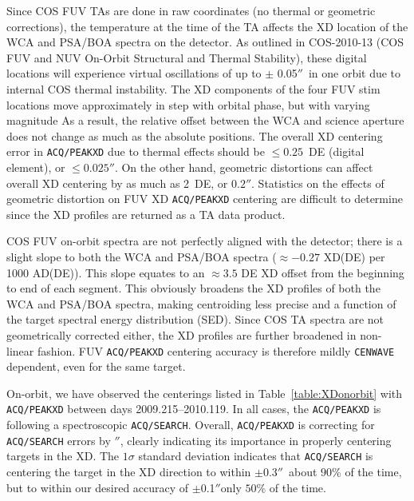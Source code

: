 \documentclass[12pt]{article}
\newcommand{\arcsec}{\ensuremath{''}}
\newcommand{\reallastdate}{2010.119}
\begin{document}
Since COS FUV TAs are done in raw coordinates (no thermal or geometric corrections), the
temperature at the time of the TA affects the XD location of the WCA and PSA/BOA spectra on
the detector. As outlined in COS-2010-13 (COS FUV and NUV On-Orbit Structural and Thermal Stability),
these digital locations will experience virtual oscillations of up to $\pm$ 0.05\arcsec\ in one orbit due to internal COS thermal instability.
The XD components of the four FUV stim locations move approximately in step with orbital phase, but with varying
magnitude As a result, the relative offset between the WCA and science aperture does not change as much as the absolute positions.
The overall XD centering error in \texttt{ACQ/PEAKXD} due to thermal effects should be $\le 0.25$~DE (digital element), or $\le 0.025$\arcsec.
On the other hand, geometric distortions can affect overall XD centering by as much as 2~DE, or $0.2$\arcsec. Statistics on the
effects of geometric distortion on FUV XD \texttt{ACQ/PEAKXD} centering are difficult to determine since the XD profiles are returned as a TA data product.

COS FUV on-orbit spectra are not perfectly aligned with the detector; there is a slight slope to both the WCA and PSA/BOA spectra ($\approx -0.27$ XD(DE) per 1000 AD(DE)).
This slope equates to an $\approx 3.5$ DE XD offset from the beginning to end of each segment.
This obviously broadens the XD profiles of both the WCA and PSA/BOA spectra, making centroiding
less precise and a function of the target spectral energy distribution (SED).
Since COS TA spectra are not geometrically corrected either, the XD profiles are further broadened
in non-linear fashion. FUV \texttt{ACQ/PEAKXD} centering accuracy is therefore mildly \texttt{CENWAVE} dependent, even for the same target.

On-orbit, we have observed the centerings listed in Table~\ref{table:XDonorbit} with \texttt{ACQ/PEAKXD} between days 2009.215--\reallastdate.
In all cases, the \texttt{ACQ/PEAKXD} is following a spectroscopic \texttt{ACQ/SEARCH}.
Overall, \texttt{ACQ/PEAKXD} is correcting for \texttt{ACQ/SEARCH} errors by \avgXD\arcsec,
clearly indicating its importance in properly centering targets in the XD.
The $1\sigma$ standard deviation indicates that \texttt{ACQ/SEARCH} is centering the
target in the XD direction to within $\pm$0.3\arcsec\ about $90$\% of the time, but to within our desired
accuracy of $\pm$0.1\arcsec only $50$\% of the time.
\end{document}
